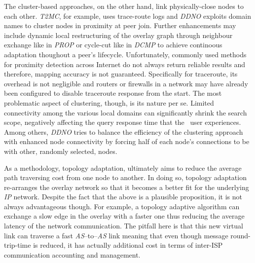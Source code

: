 The cluster-based approaches, on the other hand, 
link physically-close nodes to each other. 
\emph{T2MC}, for example, uses trace-route logs and 
\emph{DDNO} exploits domain names to cluster nodes in proximity at peer join.
Further enhancements may include dynamic local restructuring of the overlay
graph through neighbour exchange like in \emph{PROP} or cycle-cut like in
\emph{DCMP} to achieve continoous adaptation thoughout a peer's lifecycle.
Unfortunately, commonly used methods for proximity detection across Internet do
not always return
reliable results and therefore, mapping accuracy is not guaranteed. Specifically
for traceroute, its overhead is not negligible and routers or firewalls in a
network may have already been configured to disable traceroute response from
the start. The most problematic aspect of clustering, though, is
its nature per se. 
Limited connectivity among the various local domains can
significantly shrink the search scope, negatively affecting the query response
time that the \p\ user experiences. Among others, \emph{DDNO} tries to 
balance the efficiency of the clustering approach 
with enhanced node connectivity by forcing half of each node's connections to be
with other, randomly selected, nodes.

As a methodology, topology adaptation, ultimately aims to reduce the 
average path traversing cost from one node to another.
In doing so, topology adaptation re-arranges the
overlay network so that it becomes a better fit 
for the underlying \emph{IP} network.
Despite the fact that the above is a plausible proposition,
it is not always advantageous though. For example, a topology adaptive
algorithm can exchange a slow edge in the overlay with a faster one
thus reducing the average latency of the network communication.
The pitfall here is that this new virtual link
can traverse a fast \emph{AS}--to--\emph{AS} link meaning that even though
message round-trip-time is reduced, it has actually additional cost in terms of
inter-ISP communication accounting and management.

